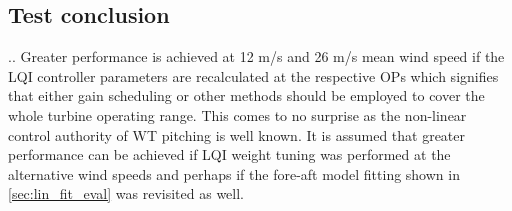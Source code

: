 \subsection{Test conclusion}


.. Greater performance is achieved at 12 m/s and 26 m/s mean wind speed if the LQI controller parameters are recalculated at the respective OPs which signifies that either gain scheduling or other methods should be employed to cover the whole turbine operating range. This comes to no surprise as the non-linear control authority of WT pitching is well known. It is assumed that greater performance can be achieved if LQI weight tuning was performed at the alternative wind speeds and perhaps if the fore-aft model fitting shown in \cref{sec:lin_fit_eval} was revisited as well.